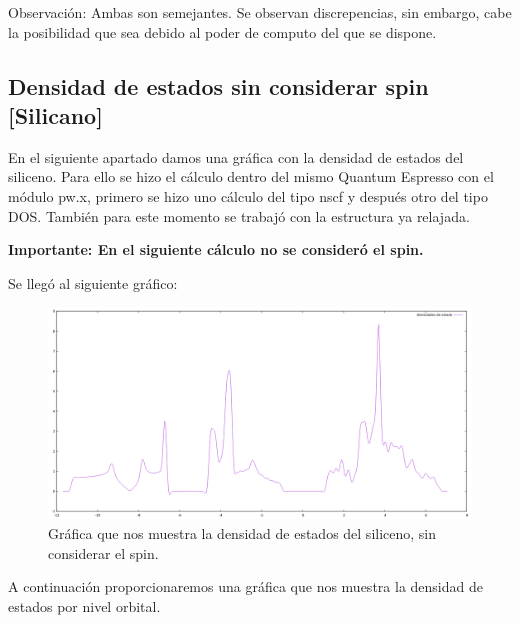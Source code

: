 \vspace{0.2cm}

Observación: Ambas son semejantes. Se observan discrepencias,
sin embargo, cabe la posibilidad que sea debido al poder de computo del que se dispone.



\newpage

\subsection{Densidad de estados sin considerar spin [Silicano]}

En el siguiente apartado damos una gráfica con la densidad de estados del siliceno. Para 
ello se hizo el cálculo dentro del mismo Quantum Espresso con el módulo pw.x, primero se hizo uno cálculo 
del tipo nscf y después otro del tipo DOS. También para este momento se trabajó con la estructura
ya relajada.

\vspace{0.5cm}

\textbf{Importante: En el siguiente cálculo no se consideró el spin.}

\vspace{0.5cm}

Se llegó al siguiente gráfico:

\begin{figure}[H]
    \centering
    \includegraphics[scale=0.35]{images_silicano/Densidades_estado_sin_spin.png}
    \caption{Gráfica que nos muestra la densidad de estados del siliceno, sin considerar el spin.}
\end{figure}

A continuación proporcionaremos una gráfica que nos muestra la 
densidad de estados por nivel orbital.

